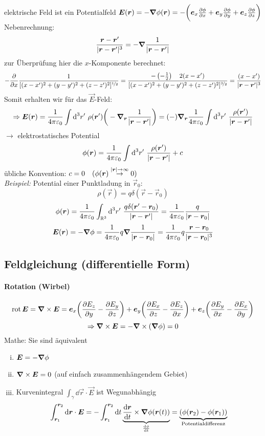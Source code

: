 elektrische Feld ist ein Potentialfeld $\bm{E}(\bm{r}) = - \bm{\nabla}\phi(\bm{r}) = - \bigg( \bm{e}_x \frac{\partial \phi}{\partial x} + \bm{e}_y \frac{\partial \phi}{\partial y} + \bm{e}_z \frac{\partial \phi}{\partial z}\bigg)$\\
Nebenrechnung:
$$\frac{\bm{r} - \bm{r}'}{|\bm{r} - \bm{r}'|^3} = -\bm{\nabla}\frac{1}{|\bm{r}-\bm{r}'|}$$
zur Überprüfung hier die $ x $-Komponente berechnet:
$$-\frac{\partial }{\partial x} \frac{1}{[(x-x')^2 + (y-y')^2 + (z-z')^2]^{\nicefrac{1}{2}}} =  \frac{- \left(-\frac{1}{2}\right) \quad 2(x-x')}{[(x-x')^2 + (y-y')^2 + (z-z')^2]^{\nicefrac{3}{2}}} = \frac{(x-x')}{|\bm{r} - \bm{r}'|^3}$$
Somit erhalten wir für das $ \vec{E} $-Feld:
$$\Rightarrow \vec{E}(\vec{r}) = \kq \int \dd^3 r'\ \rho(\vec{r}') \bigg(-\vabla_{\vec{r}} \frac{1}{|\vec{r} - \vec{r}'|} \bigg) = (-) \vabla_{\vec{r}} \kq \int \dd^3 r'\ \frac{\rho(\vec{r}')}{|\vec{r} - \vec{r}'|}$$
$\rightarrow$ elektrostatisches Potential
$$\phi(\bm{r}) = \frac{1}{4\pi\varepsilon_0} \int \textrm{d}^3 r'\ \frac{\rho(\bm{r}')}{|\bm{r} - \bm{r}'|} + c$$
übliche Konvention: $c = 0 \quad (\phi(\vec{r})\buildrel{|\vec{r}| \to \infty}\over{\rightarrow} 0)$\\[5pt]
\emph{Beispiel:} Potential einer Punktladung in $\vec{r}_0$:
$$\rho(\vec{r}) = q \delta(\vec{r}-\vec{r}_0)$$
$$\phi(\bm{r}) = \frac{1}{4 \pi \varepsilon_0} \int_{\mathbb R^3} \textrm{d}^3 r'\ \frac{q\delta(\bm{r}' - \bm{r}_0)}{|\bm{r}-\bm{r}'|} = \frac{1}{4\pi\varepsilon_0} \frac{q}{|\bm{r} - \bm{r}_0|}$$
$$\bm{E}(\bm{r}) = - \bm{\nabla} \phi = \frac{1}{4\pi\varepsilon_0} q \bm{\nabla} \frac{1}{|\bm{r} - \bm{r}_0|} = \frac{1}{4\pi\varepsilon_0} q \frac{\bm{r} - \bm{r}_0}{|\bm{r} - \bm{r}_0|^3}$$


\noindent
{}
%
%
%
%
%
%
\subsection{Feldgleichung (differentielle Form)}

\paragraph{Rotation (Wirbel)}
$$\textrm{rot}\, \bm{E} =  \bm{\nabla} \times \bm{E} = \bm{e}_x \bigg(\frac{\partial E_z}{\partial y} - \frac{\partial E_y}{\partial z}\bigg) + \bm{e}_y \bigg(\frac{\partial E_x}{\partial z} - \frac{\partial E_z}{\partial x}\bigg) + \bm{e}_z \bigg(\frac{\partial E_y}{\partial x} - \frac{\partial E_x}{\partial y}\bigg)$$
$$\Rightarrow \bm{\nabla} \times \bm{E} = - \bm{\nabla} \times (\bm{\nabla}\phi) = 0$$
Mathe: Sie sind äquivalent
\begin{enumerate}[i)]
	\item $\bm{E} = - \bm{\nabla}\phi$
	\item $\bm{\nabla} \times \bm{E} = 0$ (auf einfach zusammenhängendem Gebiet)
	\item Kurvenintegral $\int_\gamma \dd\vec{r} \cdot \vec{E}$ ist Wegunabhängig 
	$$\int_{\bm{r}_1}^{\bm{r}_2} \textrm{d}\bm{r} \cdot \bm{E} = - \int_{\bm{r}_1}^{\bm{r}_2} \textrm{d} t \underbrace{\frac{\textrm{d}\bm{r}}{\textrm{d} t}\times \bm{\nabla}\phi(\bm{r}(t))}_{\frac{\textrm{d}\phi}{\textrm{d} t}} = \underbrace{(\phi(\bm{r}_2) - \phi(\bm{r}_1))}_{\textrm{Potentialdifferenz}} $$
\end{enumerate}

